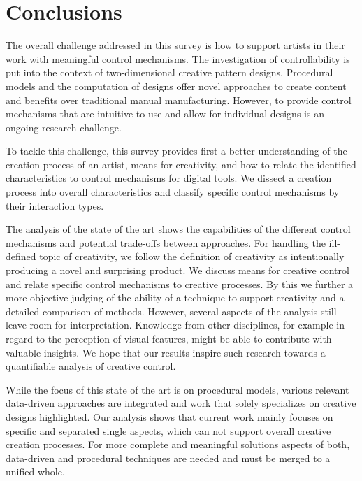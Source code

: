

\section{Conclusions}
\label{sec:conclusion}



The overall challenge addressed in this survey is how to support artists in their work with meaningful control mechanisms. The investigation of controllability is put into the context of two-dimensional creative pattern designs. Procedural models and the computation of designs offer novel approaches to create content and benefits over traditional manual manufacturing. However, to provide control mechanisms that are intuitive to use and allow for individual designs is an ongoing research challenge.

To tackle this challenge, this survey provides first a better understanding of the creation process of an artist, means for creativity, and how to relate the identified characteristics to control mechanisms for digital tools. We dissect a creation process into overall characteristics and classify specific control mechanisms by their interaction types. 

The analysis of the state of the art shows the capabilities of the different control mechanisms and potential trade-offs between approaches. For handling the ill-defined topic of creativity, we follow the definition of creativity as intentionally producing a novel and surprising product. We discuss means for creative control and relate specific control mechanisms to creative processes. By this we further a more objective judging of the ability of a technique to support creativity and a detailed comparison of methods. However, several aspects of the analysis still leave room for interpretation. Knowledge from other disciplines, for example in regard to the perception of visual features, might be able to contribute with valuable insights. We hope that our results inspire such research towards a quantifiable analysis of creative control.

While the focus of this state of the art is on procedural models, various relevant data-driven approaches are integrated and work that solely specializes on creative designs highlighted. Our analysis shows that current work mainly focuses on specific and separated single aspects, which can not support overall creative creation processes. For more complete and meaningful solutions aspects of both, data-driven and procedural techniques are needed and must be merged to a unified whole.

